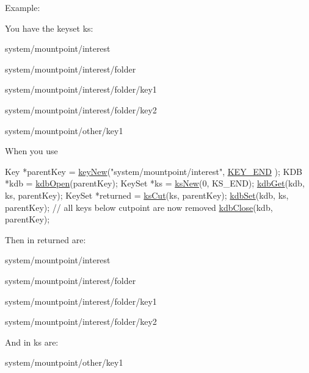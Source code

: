 \begin{DoxyParagraph}{Example\-:}

\end{DoxyParagraph}
You have the keyset {\ttfamily ks\-:} 
\begin{DoxyItemize}
\item {\ttfamily system/mountpoint/interest} 
\item {\ttfamily system/mountpoint/interest/folder} 
\item {\ttfamily system/mountpoint/interest/folder/key1} 
\item {\ttfamily system/mountpoint/interest/folder/key2} 
\item {\ttfamily system/mountpoint/other/key1} 
\end{DoxyItemize}

When you use 
\begin{DoxyCodeInclude}
        Key *parentKey = \hyperlink{group__key_gad23c65b44bf48d773759e1f9a4d43b89}{keyNew}(\textcolor{stringliteral}{"system/mountpoint/interest"}, \hyperlink{group__key_gga91fb3178848bd682000958089abbaf40aa8adb6fcb92dec58fb19410eacfdd403}{KEY\_END}
      );
        KDB *kdb = \hyperlink{group__kdb_ga6808defe5870f328dd17910aacbdc6ca}{kdbOpen}(parentKey);
        KeySet *ks = \hyperlink{group__keyset_ga671e1aaee3ae9dc13b4834a4ddbd2c3c}{ksNew}(0, KS\_END);
        \hyperlink{group__kdb_ga28e385fd9cb7ccfe0b2f1ed2f62453a1}{kdbGet}(kdb, ks, parentKey);
        KeySet *returned = \hyperlink{group__keyset_ga6b00cf82b59af4d883a9bad6cf4a4a4a}{ksCut}(ks, parentKey);
        \hyperlink{group__kdb_ga11436b058408f83d303ca5e996832bcf}{kdbSet}(kdb, ks, parentKey); \textcolor{comment}{// all keys below cutpoint are now
       removed}
        \hyperlink{group__kdb_gadb54dc9fda17ee07deb9444df745c96f}{kdbClose}(kdb, parentKey);
\end{DoxyCodeInclude}
 Then in {\ttfamily returned} are\-:
\begin{DoxyItemize}
\item {\ttfamily system/mountpoint/interest} 
\item {\ttfamily system/mountpoint/interest/folder} 
\item {\ttfamily system/mountpoint/interest/folder/key1} 
\item {\ttfamily system/mountpoint/interest/folder/key2} 
\end{DoxyItemize}

And in {\ttfamily ks} are\-:
\begin{DoxyItemize}
\item {\ttfamily system/mountpoint/other/key1} 
\end{DoxyItemize}

